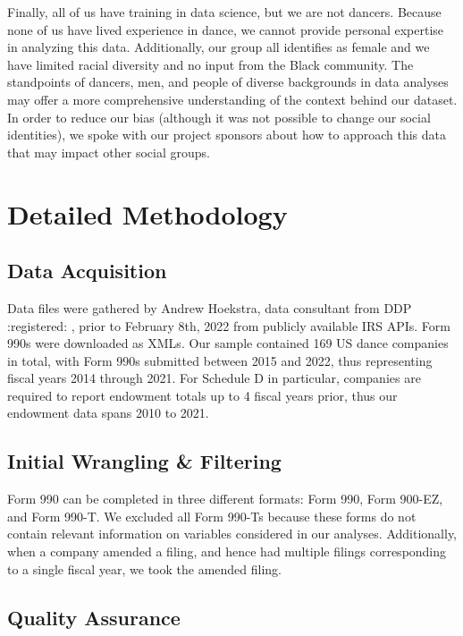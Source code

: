 \documentclass[Dance Data
Project,article,submit,moreauthors,pdftex]{mdpi}
\begin{document}
Finally, all of us have training in data science, but we are not
dancers. Because none of us have lived experience in dance, we cannot
provide personal expertise in analyzing this data. Additionally, our
group all identifies as female and we have limited racial diversity and
no input from the Black community. The standpoints of dancers, men, and
people of diverse backgrounds in data analyses may offer a more
comprehensive understanding of the context behind our dataset. In order
to reduce our bias (although it was not possible to change our social
identities), we spoke with our project sponsors about how to approach
this data that may impact other social groups.

\hypertarget{detailed-methodology}{%
\section{Detailed Methodology}\label{detailed-methodology}}

\hypertarget{data-acquisition}{%
\subsection{Data Acquisition}\label{data-acquisition}}

Data files were gathered by Andrew Hoekstra, data consultant from DDP
:registered: , prior to February 8th, 2022 from publicly available IRS
APIs. Form 990s were downloaded as XMLs. Our sample contained 169 US
dance companies in total, with Form 990s submitted between 2015 and
2022, thus representing fiscal years 2014 through 2021. For Schedule D
in particular, companies are required to report endowment totals up to 4
fiscal years prior, thus our endowment data spans 2010 to 2021.

\hypertarget{initial-wrangling-filtering}{%
\subsection{Initial Wrangling \&
Filtering}\label{initial-wrangling-filtering}}

Form 990 can be completed in three different formats: Form 990, Form
900-EZ, and Form 990-T. We excluded all Form 990-Ts because these forms
do not contain relevant information on variables considered in our
analyses. Additionally, when a company amended a filing, and hence had
multiple filings corresponding to a single fiscal year, we took the
amended filing.

\hypertarget{quality-assurance}{%
\subsection{Quality Assurance}\label{quality-assurance}}
\end{document}
